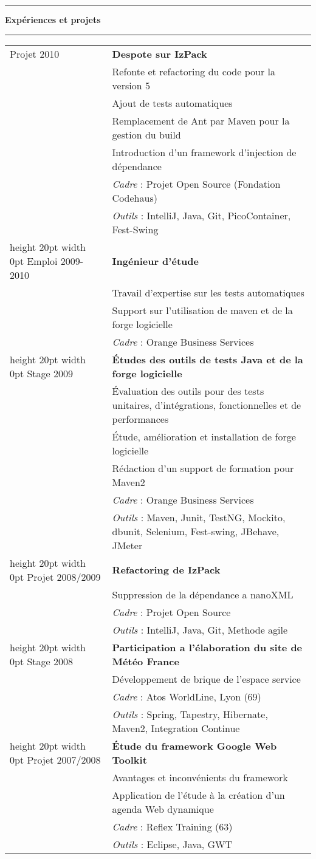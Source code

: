 \documentclass[a4paper,11pt]{article}
\newcommand\espace{\vrule height 20pt width 0pt}
\newcommand{\titre}[1]{%
	\begin{center}
	\bigskip
	\rule{\textwidth}{1pt}
	\par\vspace{0.1cm}
        \textbf{\LARGE #1}
	\par\rule{\textwidth}{1pt}
	\end{center}
	\bigskip
}
\begin{document}
\titre{Expériences et projets}

\begin{tabular}{l@{ }p{}}
Projet 2010 & \textbf{Despote sur IzPack}\\
&Refonte et refactoring du code pour la version 5 \\
&Ajout de tests automatiques \\
&Remplacement de Ant par Maven pour la gestion du build\\
&Introduction d'un framework d'injection de dépendance\\
& \textit{Cadre} : Projet Open Source (Fondation Codehaus) \\
& \textit{Outils} : IntelliJ, Java, Git, PicoContainer, Fest-Swing \\
\espace
Emploi 2009-2010 & \textbf{Ingénieur d'étude} \\
& Travail d'expertise sur les tests automatiques \\
& Support sur l'utilisation de maven et de la forge logicielle \\
& \textit{Cadre} : Orange Business Services \\
\espace
Stage 2009 & \textbf{Études des outils de tests Java et de la forge logicielle} \\
& Évaluation des outils pour des tests unitaires, d'intégrations, fonctionnelles et de performances \\
& Étude, amélioration et installation de forge logicielle \\
& Rédaction d'un support de formation pour Maven2 \\
& \textit{Cadre} : Orange Business Services \\
& \textit{Outils} : Maven, Junit, TestNG, Mockito, dbunit, Selenium, Fest-swing, JBehave, JMeter\\
\espace 
Projet 2008/2009 & \textbf{Refactoring de IzPack} \\ 
& Suppression de la dépendance a nanoXML \\
& \textit{Cadre} : Projet Open Source \\
& \textit{Outils} : IntelliJ, Java, Git, Methode agile \\
\espace
Stage 2008 & \textbf{Participation a l'élaboration du site de Météo France}  \\
& Développement de brique de l'espace service \\ 
& \textit{Cadre} : Atos WorldLine, Lyon (69) \\
& \textit{Outils} : Spring, Tapestry, Hibernate, Maven2, Integration Continue \\ 
\espace
Projet 2007/2008 & \textbf{Étude du framework Google Web Toolkit} \\
& Avantages et inconvénients du framework \\
& Application de l'étude à la création d'un agenda Web dynamique \\ 
& \textit{Cadre} : Reflex Training (63) \\
& \textit{Outils} : Eclipse, Java, GWT \\

\end{tabular}
\end{document}
